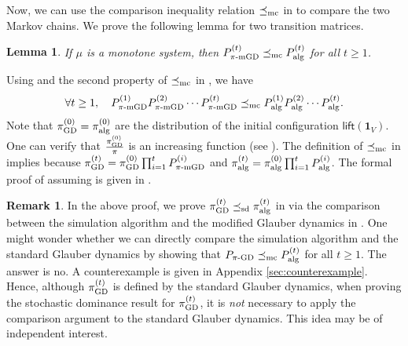 \documentclass[11pt,a4paper]{article}
\newcommand{\mc}{\preceq_{\textnormal{mc}}}
\newcommand{\sd}{\preceq_{\textnormal{sd}}}
\newtheorem{lemma}[theorem]{Lemma}
\theoremstyle{definition}
\newtheorem{remark}[theorem]{Remark}
\def\*#1{\mathbf{#1}} %
\begin{document}
Now, we can use the comparison inequality relation $\mc$ in  to compare the two Markov chains.
We prove the following lemma for two transition matrices.
\begin{lemma}\label{lem:phase-comparison}
    If $\mu$ is a monotone system, then $P_{\pi\textnormal{-mGD}}^{(t)} \mc P_{\textnormal{alg}}^{(t)}$ for all $t \geq 1$. 
\end{lemma}
Using  and the second property of $\mc$ in , we have
\begin{align*}
  \forall t \geq 1, \quad P_{\pi\textnormal{-mGD}}^{(1)}P_{\pi\textnormal{-mGD}}^{(2)} \cdots P_{\pi\textnormal{-mGD}}^{(t)} \mc P_{\textnormal{alg}}^{(1)}P_{\textnormal{alg}}^{(2)} \cdots P_{\textnormal{alg}}^{(t)}.  
\end{align*}
Note that $\pi^{(0)}_{\textnormal{GD}} = \pi^{(0)}_{\textnormal{alg}}$ are the distribution of the initial configuration $\textsf{lift}(\*1_V)$. One can verify that $\frac{\pi^{(0)}_{\textnormal{GD}}}{\pi}$ is an increasing function (see ). The definition of $\mc$ in  implies  because $\pi^{(t)}_{\textnormal{GD}} = \pi^{(0)}_{\textnormal{GD}}\prod_{i=1}^t P_{\pi\textnormal{-mGD}}^{(i)}$ and $\pi^{(t)}_{\textnormal{alg}} = \pi^{(0)}_{\textnormal{alg}}\prod_{i=1}^t P_{\textnormal{alg}}^{(i)}$. The formal proof of  assuming  is given in .

\begin{remark}
In the above proof, we prove $\pi^{(t)}_{\textnormal{GD}} \sd \pi^{(t)}_{\textnormal{alg}}$ in  via the comparison between the simulation algorithm and the modified Glauber dynamics in . One might wonder whether we can directly compare the simulation algorithm and the standard Glauber dynamics by showing that $P_{\pi\textnormal{-GD}} \mc P_{\textnormal{alg}}^{(t)}$ for all $t \geq 1$. The answer is no. A counterexample is given in Appendix \ref{sec:counterexample}. Hence, although $\pi^{(t)}_{\textnormal{GD}}$ is defined by the standard Glauber dynamics, when proving the stochastic dominance result for $\pi^{(t)}_{\textnormal{GD}}$, it is \emph{not} necessary to apply the comparison argument to the standard Glauber dynamics. This idea may be of independent interest.
\end{remark}
\end{document}
